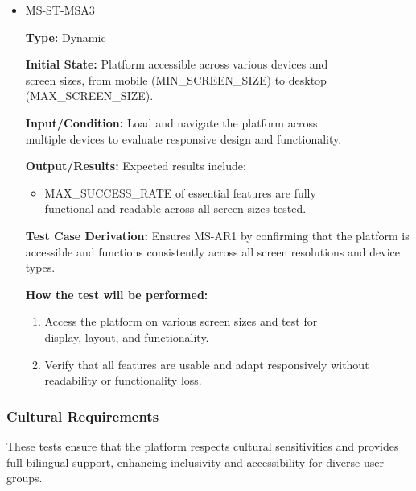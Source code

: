 \documentclass[12pt, titlepage]{article}
\begin{document}
\begin{itemize}
  \item MS-ST-MSA3
  \begin{mdframed}[linewidth=0.5mm] 
    \textbf{Type:} Dynamic \par 
    \textbf{Initial State:} Platform accessible across various devices and \\screen sizes, from mobile (MIN\_SCREEN\_SIZE) to desktop \\(MAX\_SCREEN\_SIZE). \par 
    \textbf{Input/Condition:} Load and navigate the platform across \\multiple devices to evaluate responsive design and functionality. \par 
    \textbf{Output/Results:} Expected results include: 
    \begin{itemize} 
      \item MAX\_SUCCESS\_RATE of essential features are fully \\functional and readable across all screen sizes tested. 
    \end{itemize} \par
    \textbf{Test Case Derivation:} Ensures MS-AR1 by confirming that the platform is accessible and functions consistently across all screen resolutions and device types. \par
    \textbf{How the test will be performed:} 
    \begin{enumerate}[noitemsep] 
      \item Access the platform on various screen sizes and test for \\display, layout, and functionality. 
      \item Verify that all features are usable and adapt responsively without readability or functionality loss. 
    \end{enumerate} 
  \end{mdframed} 
\end{itemize}

\subsubsection{Cultural Requirements}

\hspace{2em}These tests ensure that the platform respects cultural sensitivities and provides full bilingual support, enhancing inclusivity and accessibility for diverse user groups.
\end{document}
